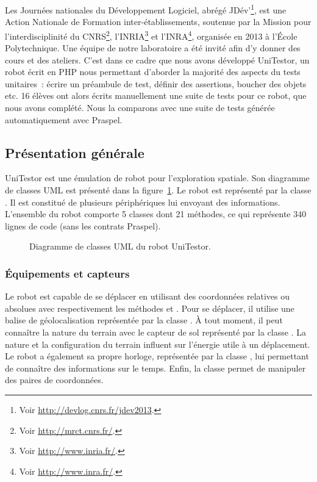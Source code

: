 Les Journées nationales du Développement Logiciel, abrégé JDév'\footnote{Voir
\url{http://devlog.cnrs.fr/jdev2013}.}, est une Action Nationale de Formation
inter-établissements, soutenue par la Mission pour l'interdisciplinité du
CNRS\footnote{Voir \url{http://mrct.cnrs.fr/}.}, l'INRIA\footnote{Voir
\url{http://www.inria.fr/}.} et l'INRA\footnote{Voir
\url{http://www.inra.fr/}.}, organisée en 2013 à l'École Polytechnique. Une
équipe de notre laboratoire a été invité afin d'y donner des cours et des
ateliers. C'est dans ce cadre que nous avons développé UniTestor, un robot écrit
en PHP nous permettant d'aborder la majorité des aspects du tests unitaires~:
écrire un préambule de test, définir des assertions, boucher des objets etc. 16
élèves ont alors écrits manuellement une suite de tests pour ce robot, que nous
avons complété. Nous la comparons avec une suite de tests générée
automatiquement avec Praspel.

\subsection{Présentation générale}

UniTestor est une émulation de robot pour l'exploration spatiale. Son diagramme
de classes UML est présenté dans la
figure~\ref{figure:experimentation:unitestor}. Le robot est représenté par la
classe . Il est constitué de plusieurs périphériques lui envoyant
des informations. L'ensemble du robot comporte 5 classes dont 21 méthodes, ce
qui représente 340 lignes de code (sans les contrats Praspel).
%
\begin{figure}


\caption{\label{figure:experimentation:unitestor} Diagramme de classes UML du
robot UniTestor.}

\end{figure}

\subsubsection{Équipements et capteurs}

Le robot est capable de se déplacer en utilisant des coordonnées relatives ou
absolues avec respectivement les méthodes  et . Pour se
déplacer, il utilise une balise de géolocalisation représentée par la classe
. À tout moment, il peut connaître la nature du terrain avec
le capteur de sol représenté par la classe . La nature et la
configuration du terrain influent sur l'énergie utile à un déplacement. Le robot
a également sa propre horloge, représentée par la classe , lui
permettant de connaître des informations sur le temps. Enfin, la classe
 permet de manipuler des paires de coordonnées.

